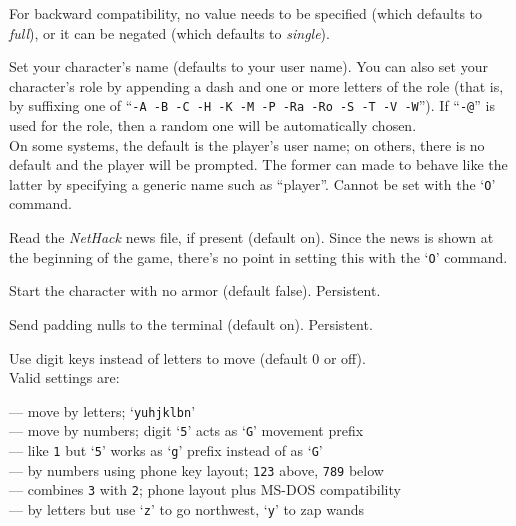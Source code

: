 \documentclass[titlepage]{article}
\begin{document}
\begin{description}[font=\mdseries\itshape]
For backward compatibility, no value needs to be specified (which
defaults to \textit{full}), or it can be negated (which defaults
to \textit{single}).
\item[name]
Set your character's name (defaults to your user name).  You can also
set your character's role by appending a dash and one or more letters of
the role (that is, by suffixing one of
``\texttt{-A -B -C -H -K -M -P -Ra -Ro -S -T -V -W}'').
If ``\texttt{-@}'' is used for the role, then a random one will be
automatically chosen.
\\
On some systems, the default is the player's user name;
on others, there is no default and the player will be prompted.
The former can made to behave like the latter by specifying a generic name
such as ``player''.
Cannot be set with the `\texttt{O}' command.
\item[news]
Read the \textit{NetHack} news file, if present (default on).
Since the news is shown at the beginning of the game, there's no point
in setting this with the `\texttt{O}' command.
\item[nudist]
Start the character with no armor (default false).  Persistent.
\item[null]
Send padding nulls to the terminal (default on).  Persistent.
\item[number\textunderscore pad]
Use digit keys instead of letters to move (default 0 or off).\\
Valid settings are:

\newlength{\mwidth}
\newcommand{\numbox}[1]{\makebox[\mwidth][r]{\texttt{#1}}}
\numbox{0} --- move by letters; `\texttt{yuhjklbn}'\\
\numbox{1} --- move by numbers; digit `\texttt{5}' acts as `\texttt{G}' movement prefix\\
\numbox{2} --- like \texttt{1} but `\texttt{5}' works as `\texttt{g}' prefix instead of as `\texttt{G}'\\
\numbox{3} --- by numbers using phone key layout; \texttt{123} above, \texttt{789} below\\
\numbox{4} --- combines \texttt{3} with \texttt{2}; phone layout plus MS-DOS compatibility\\
\numbox{-1} --- by letters but use `\texttt{z}' to go northwest, `\texttt{y}' to zap wands


\end{description}
\end{document}
